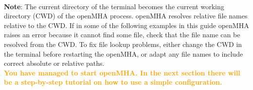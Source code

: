\documentclass[11pt,a4paper,twoside]{article}
\newcommand{\+}{\discretionary{\mbox{\scriptsize$\hookleftarrow$}}{}{}}
\begin{document}
{{\dotfill \\

\large{\textbf{Note}}:
The current directory of the terminal becomes the
current working directory (CWD) of the openMHA process.
openMHA resolves relative file names relative to the CWD.
If in some of the following examples in this guide
openMHA raises an error because it cannot find some file,
check that the file name can be resolved from the CWD.
To fix file lookup problems, either change the CWD in the
terminal before restarting the openMHA, or adapt any file
names to include correct absolute or relative paths.
\\

\textcolor{orange}{\textbf{You have managed to start openMHA. In the next section there will be a step-by-step tutorial on how to use a simple configuration.}}

\vspace{1cm}





\newpage
}}
\end{document}
